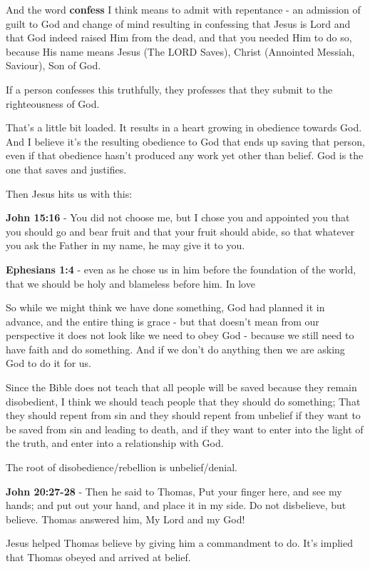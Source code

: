 \documentclass[11pt]{article}
\begin{document}
And the word \textbf{confess} I think means to admit with repentance - an admission of guilt to God and change of mind resulting in confessing that Jesus is Lord and that God indeed raised Him from the dead, and that you needed Him to do so, because His name means Jesus (The LORD Saves), Christ (Annointed Messiah, Saviour), Son of God.

If a person confesses this truthfully, they professes that they submit to the righteousness of God.

That's a little bit loaded. It results in a heart growing in obedience towards God.
And I believe it's the resulting obedience to God that ends up saving that person, even if that obedience hasn't produced any work yet other than belief. God is the one that saves and justifies.

Then Jesus hits us with this:

\textbf{John 15:16} - You did not choose me, but I chose you and appointed you that you should go and bear fruit and that your fruit should abide, so that whatever you ask the Father in my name, he may give it to you.

\textbf{Ephesians 1:4} - even as he chose us in him before the foundation of the world, that we should be holy and blameless before him. In love

So while we might think we have done something, God had planned it in advance, and the entire thing is grace - but that doesn't mean from our perspective it does not look like we need to obey God - because we still need to have faith and do something. And if we don't do anything then we are asking God to do it for us.

Since the Bible does not teach that all people will be saved because they remain disobedient, I think we should teach people that they should do something; That they should repent from sin and they should repent from unbelief if they want to be saved from sin and leading to death, and if they want to enter into the light of the truth, and enter into a relationship with God.

The root of disobedience/rebellion is unbelief/denial.

\textbf{John 20:27-28} - Then he said to Thomas, Put your finger here, and see my hands; and put out your hand, and place it in my side. Do not disbelieve, but believe. Thomas answered him, My Lord and my God!

Jesus helped Thomas believe by giving him a commandment to do. It's implied that Thomas obeyed and arrived at belief.
\end{document}
